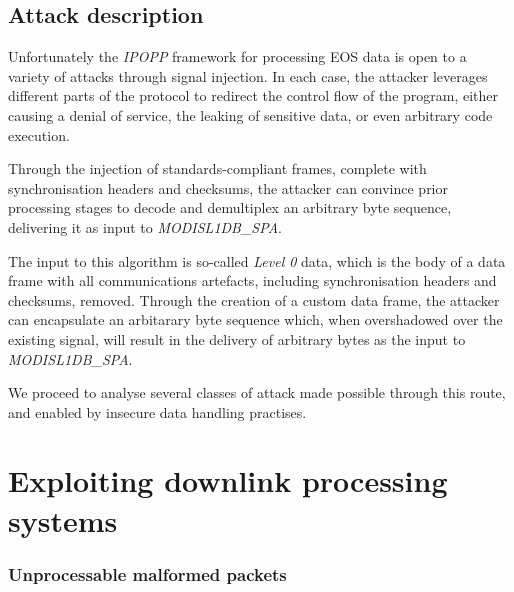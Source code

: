 


\subsection{Attack description}


Unfortunately the \textit{IPOPP} framework for processing EOS data is open to a variety of attacks through signal injection.
In each case, the attacker leverages different parts of the protocol to redirect the control flow of the program, either causing a denial of service, the leaking of sensitive data, or even arbitrary code execution.

Through the injection of standards-compliant frames, complete with synchronisation headers and checksums, the attacker can convince prior processing stages to decode and demultiplex an arbitrary byte sequence, delivering it as input to \textit{MODISL1DB\_SPA}.

The input to this algorithm is so-called \textit{Level 0} data, which is the body of a data frame with all communications artefacts, including synchronisation headers and checksums, removed.
Through the creation of a custom data frame, the attacker can encapsulate an arbitarary byte sequence which, when overshadowed over the existing signal, will result in the delivery of arbitrary bytes as the input to \textit{MODISL1DB\_SPA}.

We proceed to analyse several classes of attack made possible through this route, and enabled by insecure data handling practises.


\section{Exploiting downlink processing systems}

\subsubsection{Unprocessable malformed packets}


